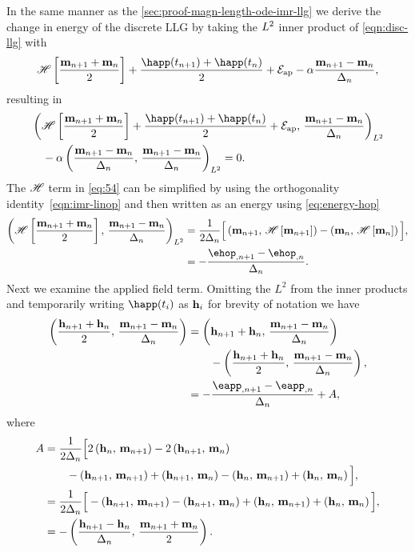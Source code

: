 In the same manner as the \cref{sec:proof-magn-length-ode-imr-llg} we derive the change in energy of the discrete LLG by taking the $L^2$ inner product of \cref{eqn:disc-llg} with
\begin{equation}
  \mphop + \frac{\happ(t_{n+1}) + \happ(t_n)}{2} + \happerror - \dampc \mpdmdt,
\end{equation}
resulting in
\begin{equation}
  \begin{aligned}
    &\ltip{\mphop + \frac{\happ(t_{n+1}) + \happ(t_n)}{2} + \happerror}{\mpdmdt} \\
    & \quad - \dampc \ltip{\mpdmdt}{\mpdmdt} = 0.
    \label{eq:54}
  \end{aligned}
\end{equation}
The $\mathscr{H}$ term in \cref{eq:54} can be simplified by using the orthogonality identity~\cref{eqn:imr-linop} and then written as an energy using \cref{eq:energy-hop}
\begin{equation}
  \begin{aligned}
    \ltip{\mphop}{\mpdmdt} 
    &= \frac{1}{2\dtn} \Big[\ip{\mv_{n+1}}{\hop \left[\mv_{n+1} \right]}
    - \ip{\mv_{n}}{ \hop\left[ \mv_{n} \right]} \Big], \\
    &= -\frac{\ehop_{,n+1} - \ehop_{,n}}{\dtn}.
  \end{aligned}
  \label{eq:50}
\end{equation}
Next we examine the applied field term.
Omitting the $L^2$ from the inner products and temporarily writing $\happ(t_i)$ as $\mathbf{h}_i$ for brevity of notation we have
\begin{equation}
  \begin{aligned}
    \ip{\frac{\hv_{n+1} + \hv_n}{2}}{\mpdmdt}
    &= \ip{\hv_{n+1} + \hv_n}{\mpdmdt} \\
    & \qquad - \ip{\frac{\hv_{n+1} + \hv_n}{2}}{\mpdmdt}, \\
    &= -\frac{\eapp_{, n+1} - \eapp_{, n}}{\dtn}  + A,
  \end{aligned}
\end{equation}
where
\begin{equation}
  \begin{aligned}
    A &= \frac{1}{2\Delta_{n}}\Big[ 2\left(\mathbf{h}_n,\, \mathbf{m}_{n+1} \right) - 2\left(\mathbf{h}_{n+1},\, \mathbf{m}_n \right) \\
    & \qquad - \left(\mathbf{h}_{n+1},\, \mathbf{m}_{n+1} \right) +\left(\mathbf{h}_{n+1},\, \mathbf{m}_n \right) 
    - \left(\mathbf{h}_n,\, \mathbf{m}_{n+1} \right) + \left(\mathbf{h}_n,\, \mathbf{m}_n \right) \Big], \\
    &= \frac{1}{2\Delta_{n}}\Big[ - \left(\mathbf{h}_{n+1},\, \mathbf{m}_{n+1} \right) - \left(\mathbf{h}_{n+1},\, \mathbf{m}_n \right) 
    + \left(\mathbf{h}_n,\, \mathbf{m}_{n+1} \right) + \left(\mathbf{h}_n,\, \mathbf{m}_n \right) \Big], \\
    &= - \left( \frac{\mathbf{h}_{n+1} - \mathbf{h}_n}{\Delta_{n}} ,\,  \frac{\mathbf{m}_{n+1} + \mathbf{m}_n}{2}  \right). \\
    \label{eq:52}
  \end{aligned}
\end{equation}
